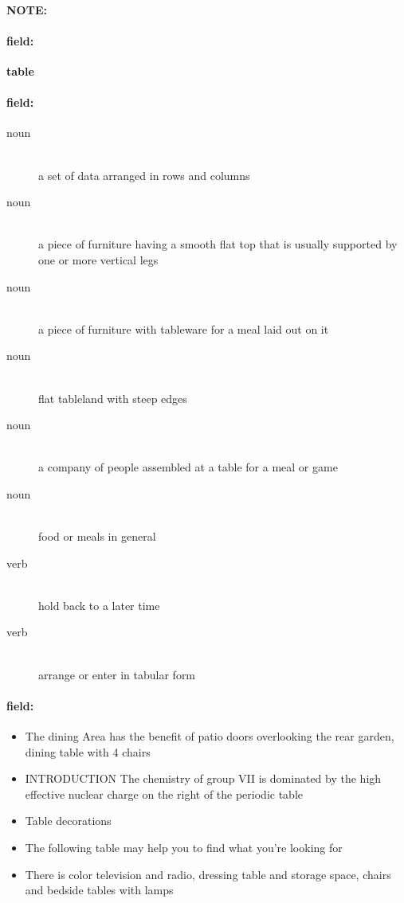 \documentclass[12pt]{article}
\newenvironment{note}{\paragraph{NOTE:}}{}
\newenvironment{field}{\paragraph{field:}}{}
\begin{document}
\begin{note}
\begin{field}
\textbf{\large table}
\end{field}


\begin{field}
\begin{description}
\item[noun] \hfill \\ 
a set of data arranged in rows and columns

\item[noun] \hfill \\ 
a piece of furniture having a smooth flat top that is usually supported by one or more vertical legs

\item[noun] \hfill \\ 
a piece of furniture with tableware for a meal laid out on it

\item[noun] \hfill \\ 
flat tableland with steep edges

\item[noun] \hfill \\ 
a company of people assembled at a table for a meal or game

\item[noun] \hfill \\ 
food or meals in general

\item[verb] \hfill \\ 
hold back to a later time

\item[verb] \hfill \\ 
arrange or enter in tabular form

\end{description}
\end{field}

\begin{field}
\begin{itemize}
\item The dining Area has the benefit of patio doors overlooking the rear garden, dining table with 4 chairs
\item INTRODUCTION The chemistry of group VII is dominated by the high effective nuclear charge on the right of the periodic table
\item Table decorations
\item The following table may help you to find what you're looking for
\item There is color television and radio, dressing table and storage space, chairs and bedside tables with lamps
\end{itemize}
\end{field}
\end{note}
\end{document}

